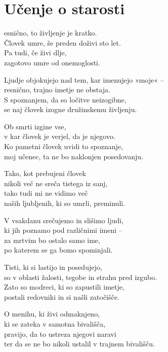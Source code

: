 \cleartorecto
{}
\chapter{Učenje o starosti}

esnično, to življenje je kratko.\\
Človek umre, še preden doživi sto let.\\
Pa tudi, če živi dlje,\\
zagotovo umre od onemoglosti.

Ljudje objokujejo nad tem, kar imenujejo »moje« --\\
resnično, trajno imetje ne obstaja.\\
S spoznanjem, da so ločitve neizogibne,\\
se naj človek izogne družinskemu življenju.

\clearpage

Ob smrti izgine vse,\\
v kar človek je verjel, da je njegovo.\\
Ko pametni človek uvidi to spoznanje,\\
moj učenec, ta ne bo naklonjen posedovanju.

Tako, kot prebujeni človek\\
nikoli več ne sreča tistega iz sanj,\\
tako tudi mi ne vidimo več\\
naših ljubljenih, ki so umrli, preminuli.

V vsakdanu srečujemo in slišimo ljudi,\\
ki jih poznamo pod različnimi imeni --\\
za mrtvim bo ostalo samo ime,\\
po katerem se ga bomo spominjali.

Tisti, ki si lastijo in posedujejo,\\
so v oblasti žalosti, tegobe in strahu pred izgubo.\\
Zato so modreci, ki so zapustili imetje,\\
postali redovniki in si našli zatočišče.

O menihu, ki živi odmaknjeno,\\
ki se zateka v samotna bivališča,\\
pravijo, da to ustreza njegovi naravi\\
ter da se ne bo nikoli ustalil v trajnem bivališču.

